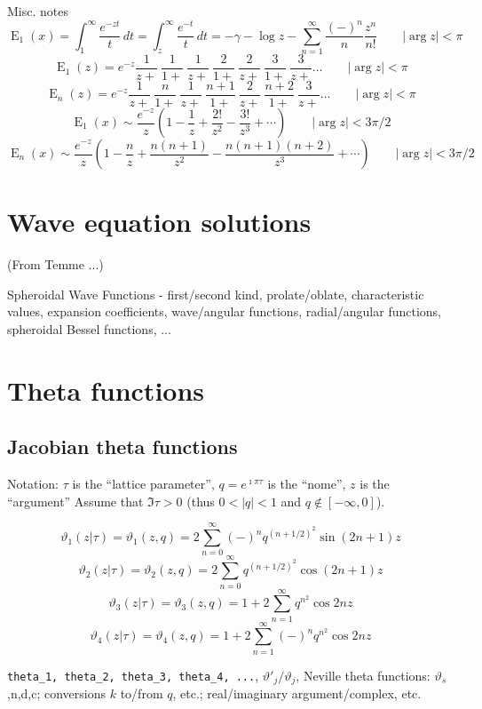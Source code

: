 \documentclass[10pt,dvipdfmx,letterpaper,twoside]{article}
\let\O=\operatorname
\newcommand{\ii}{{\hat{\imath}}}
\let\gam=\gamma
\let\theta=\vartheta
\begin{document}
Misc. notes
\[ \O{E}_1(x) = \int_1^\infty\frac{e^{-zt}}{t}\,dt = \int_z^\infty\frac{e^{-t}}{t}\,dt
  = -\gam-\log z-\sum_{n=1}^\infty\frac{(-)^n}{n}\frac{z^n}{n!} \qquad |\arg z|<\pi \]
\[ \O{E}_1(z) = e^{-z} \frac{1}{z+}\ \frac{1}{1+}\ \frac{1}{z+}\ \frac{2}{1+}\ \frac{2}{z+}\ \frac{3}{1+}\ \frac{3}{z+} \dots \qquad |\arg z|<\pi \]
\[ \O{E}_n(z) = e^{-z} \frac{1}{z+}\ \frac{n}{1+}\ \frac{1}{z+}\ \frac{n+1}{1+}\ \frac{2}{z+}\ \frac{n+2}{1+}\ \frac{3}{z+} \dots \qquad |\arg z|<\pi \]
\[ \O{E}_1(x) \sim \frac{e^{-z}}{z}\left(1-\frac{1}{z} + \frac{2!}{z^2} - \frac{3!}{z^3} + \cdots \right) \qquad |\arg z|<3\pi/2 \]
\[ \O{E}_n(x) \sim \frac{e^{-z}}{z}\left(1 - \frac{n}{z} + \frac{n(n+1)}{z^2} - \frac{n(n+1)(n+2)}{z^3} + \cdots \right) \qquad |\arg z|<3\pi/2 \]

\section{Wave equation solutions}
(From Temme ...)

Spheroidal Wave Functions
- first/second kind, prolate/oblate, characteristic values, expansion coefficients, wave/angular functions,
radial/angular functions, spheroidal Bessel functions, ...

\section{Theta functions}

\subsection{Jacobian theta functions}

Notation: $\tau$ is the ``lattice parameter'', $q=e^{\ii\pi\tau}$ is the ``nome'', $z$ is the ``argument''
Assume that $\Im\tau > 0$ (thus $0<|q|<1$ and $q\notin[-\infty,0]$).

\[ \theta_1(z|\tau) = \theta_1(z,q) = 2\sum_{n=0}^\infty(-)^n q^{(n+1/2)^2}\sin (2n+1)z \]
\[ \theta_2(z|\tau) = \theta_2(z,q) = 2\sum_{n=0}^\infty q^{(n+1/2)^2}\cos (2n+1)z \]
\[ \theta_3(z|\tau) = \theta_3(z,q) = 1 + 2\sum_{n=1}^\infty q^{n^2}\cos 2nz \]
\[ \theta_4(z|\tau) = \theta_4(z,q) = 1 + 2\sum_{n=1}^\infty(-)^n q^{n^2}\cos 2nz \]

{\tt theta\_1, theta\_2, theta\_3, theta\_4, ...}, $\theta'_j/\theta_j$, Neville theta functions: $\theta_s$,n,d,c;
conversions $k$ to/from $q$, etc.; real/imaginary argument/complex, etc.
\end{document}
